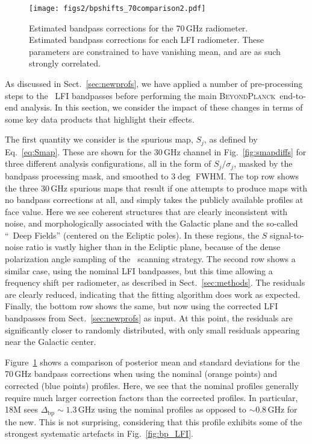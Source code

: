 \documentclass[twocolumn]{aa}
\newcommand{\Dbp}[0]{\Delta_{\mathrm{bp}}}
\newcommand{\BP}{\textsc{BeyondPlanck}}
\newcommand{\?}[1]{\textcolor{red}{{\bf [#1]}}}
\begin{document}
  
  \begin{figure}
    \center
    \texttt{[image: figs2/bpshifts\_70comparison2.pdf]}
    \caption{Estimated bandpass corrections for the 70\,GHz radiometer. Estimated bandpass corrections for each LFI radiometer. These parameters are constrained to have vanishing mean, and are as such strongly correlated.}
    \label{fig:bpshift70}
  \end{figure}

As discussed in Sect.~\ref{sec:newprofs}, we have applied a number of
pre-processing steps to the \Planck\ LFI bandpasses before performing
the main \BP\ end-to-end analysis. In this section, we consider the
impact of these changes in terms of some key data products that
highlight their effects.

The first quantity we consider is the spurious map, $S_j$, as defined by
Eq.~\eqref{eq:Smap}. These are shown for the 30\,GHz channel in
Fig.~\ref{fig:smapdiffs} for three different analysis configurations, all in the
form of $S_j/\sigma_j$, masked by the bandpass processing mask, and smoothed to
$3\deg$ FWHM. The top row shows the three 30\,GHz spurious maps that result if
one attempts to produce maps with no bandpass corrections at all, and simply
takes the publicly available profiles at face value. Here we see coherent
structures that are clearly inconsistent with noise, and morphologically
associated with the Galactic plane and the so-called ``\Planck\ Deep Fields''
(centered on the Ecliptic poles). In these regions, the $S$ signal-to-noise
ratio is vastly higher than in the Ecliptic plane, because of the dense
polarization angle sampling of the \Planck\ scanning strategy. The second row
shows a similar case, using the nominal LFI bandpasses, but this time allowing a
frequency shift per radiometer, as described in Sect.~\ref{sec:methods}. The
residuals are clearly reduced, indicating that the fitting algorithm does work
as expected. Finally, the bottom row shows the same, but now using the corrected
LFI bandpasses from Sect.~\ref{sec:newprofs} as input. At this point, the
residuals are significantly closer to randomly distributed, with only small
residuals appearing near the Galactic center.

Figure~\ref{fig:bpshift70} shows a comparison of posterior mean and
standard deviations for the 70\,GHz bandpass corrections when using
the nominal (orange points) and corrected (blue points)
profiles. Here, we see that the nominal profiles generally require
much larger correction factors than the corrected profiles. In
particular, 18M sees $\Dbp\sim1.3$\,GHz using the nominal profiles as
opposed to $\sim0.8\,$GHz for the new. This is not surprising,
considering that this profile exhibits some of the strongest
systematic artefacts in Fig.~\ref{fig:bp_LFI}. 
\end{document}
